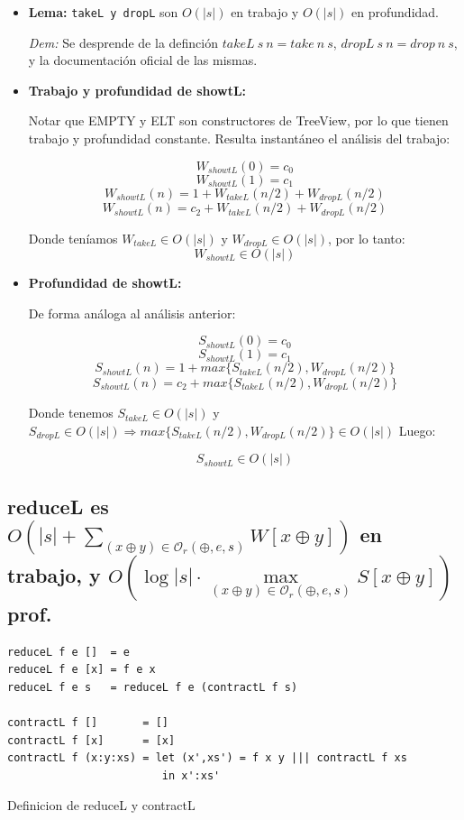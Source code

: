 \documentclass[12pt]{article}
\begin{document}
\begin{itemize}

\item \textbf{Lema:} \texttt{takeL y dropL} son $O(|s|)$ en trabajo y $O(|s|)$ en profundidad.

 \textit{Dem:} Se desprende de la definción $takeL\ s\ n = take\ n\ s$, $dropL\ s\ n = drop\ n\ s$, y la documentación oficial de las mismas. 

\item \textbf{Trabajo y profundidad de showtL:}

    Notar que EMPTY y ELT son constructores de TreeView, por lo que tienen trabajo y profundidad constante. Resulta instantáneo el análisis del trabajo: 

    $$ W_{showtL}(0) = c_0 $$
    $$ W_{showtL}(1) = c_1 $$
    $$ W_{showtL}(n) = 1 + W_{takeL}(n/2) + W_{dropL}(n/2)  $$
    $$ W_{showtL}(n) = c_2 + W_{takeL}(n/2) + W_{dropL}(n/2) $$

    Donde teníamos $W_{takeL} \in O(|s|)$ y $W_{dropL} \in O(|s|)$, por lo tanto:\\

    $$ W_{showtL} \in O(|s|) $$

\item \textbf{Profundidad de showtL:}
    
    De forma análoga al análisis anterior:

    $$ S_{showtL}(0) = c_0 $$
    $$ S_{showtL}(1) = c_1 $$
    $$ S_{showtL}(n) = 1 + max\{ S_{takeL}(n/2), W_{dropL}(n/2) \} $$
    $$ S_{showtL}(n) = c_2 + max\{ S_{takeL}(n/2), W_{dropL}(n/2) \} $$

    Donde tenemos $S_{takeL} \in O(|s|)$ y $S_{dropL} \in O(|s|) \Rightarrow max\{ S_{takeL}(n/2), W_{dropL}(n/2) \} \in O(|s|)$ Luego:

    $$ S_{showtL} \in O(|s|) $$
    
\end{itemize}


\subsection{reduceL es $O(|s| + \sum\limits_{(x\oplus y)\in\mathcal{O}_r(\oplus,e,s)} W[x\oplus y])$ en trabajo, y $O(\log |s|\cdot \max\limits_{(x\oplus y)\in\mathcal{O}_r(\oplus,e,s)} S[x\oplus y])$ prof.}

\begin{table}[h]
\begin{lstlisting}
reduceL f e []  = e
reduceL f e [x] = f e x
reduceL f e s   = reduceL f e (contractL f s)

contractL f []       = []
contractL f [x]      = [x]
contractL f (x:y:xs) = let (x',xs') = f x y ||| contractL f xs 
                        in x':xs'
\end{lstlisting}
\caption{Definicion de reduceL y contractL}
\end{table}
\end{document}
